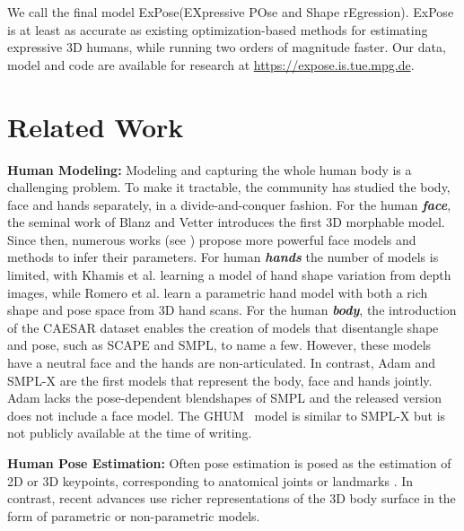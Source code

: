 \documentclass[runningheads]{llncs}
\newcommand{\modelname}{\mbox{ExPose}\xspace}
\newcommand{\modelnameExplain}{{EXpressive POse and Shape rEgression}\xspace}
\newcommand{\websiteURL}{\mbox{\url{https://expose.is.tue.mpg.de}}}
\newcommand{\smplx}{\mbox{SMPL-X}\xspace}
\newcommand{\adam}{\mbox{Adam}\xspace}
\newcommand{\ghum}{\mbox{GHUM}\xspace}
\newcommand{\smpl}{\mbox{SMPL}\xspace}
\newcommand{\twoD}{2D\xspace}
\newcommand{\threeD}{3D\xspace}
\newcommand{\etal}{et al.\xspace}
\newcommand{\highlight}[1]{\xspace{\color{black} #1}\xspace}
\newcommand{\labelBODY}[1]{\xspace{\color{black} \textbf{\emph{#1}}}\xspace}
\begin{document}
We call the final model \modelname (\modelnameExplain).
\modelname is at least as accurate as existing optimization-based methods \cite{Pavlakos_2019_CVPR} for estimating expressive \threeD humans, while running two orders of magnitude faster.
Our \highlight{data, model and code} are available for research at \websiteURL.
 \section{Related Work}
\label{sec:related_work}

\textbf{Human Modeling:}
Modeling and capturing the whole human body is a challenging problem.
To make it tractable, the community has studied the body, face and hands separately, in a \mbox{divide-and-conquer} fashion.
For the human \labelBODY{face}, the seminal work of Blanz and Vetter \cite{blanzvetter1999} introduces the first \threeD morphable model.
Since then, numerous works (see \cite{egger20193d}) propose more powerful face models and methods to infer their parameters.
For human \labelBODY{hands} the number of models is limited, with
Khamis \etal \cite{msr_2015_cvpr_learnshapemodel} learning a model of hand shape variation from depth images, while
Romero \etal \cite{romero2017embodied} learn a parametric hand model with both a rich shape and pose space from \threeD hand scans.
For the human \labelBODY{body}, the introduction of the CAESAR dataset \cite{CAESAR} enables the creation of models that disentangle shape and pose,
such as SCAPE \cite{Anguelov05} and \smpl \cite{SMPL:2015}, to name a few.
However, these models have a neutral face  and the hands are non-articulated. In contrast, \adam \cite{joo2018total} and \smplx
 \cite{Pavlakos_2019_CVPR} are the first models that represent the
 body, face and hands jointly.
\adam lacks the pose-dependent blendshapes of \smpl and the released
version does not include a face model.
The \ghum~\cite{Xu_2020_CVPR} model is similar to \smplx but is not publicly available at
the time of writing.

\textbf{Human Pose Estimation:}
Often pose estimation is posed as the estimation of \twoD or \threeD keypoints, corresponding to anatomical joints or landmarks \cite{bulat2017far,cao2018openpose,simon2017hand}.
In contrast, recent advances use richer representations of  the
\threeD  body surface in the form of parametric \cite{bogo2016keep,kanazawa_cvpr_2018,omran2018neural,pavlakos2018learning}
or non-parametric
\cite{kolotouros2019convolutional,Saito_2019_ICCV,varol2018bodynet}
models. 
\end{document}

